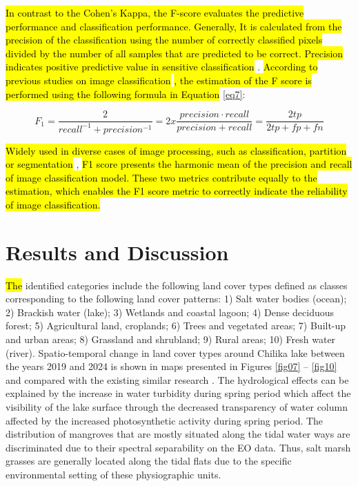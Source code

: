 \documentclass[jmse,article,submit,pdftex,moreauthors]{Definitions/mdpi}
\begin{document}
\hl{In contrast to the Cohen's Kappa, the F-score evaluates the predictive performance and classification performance. Generally, It is calculated from the precision of the classification using the number of correctly classified pixels divided by the number of all samples that are predicted to be correct. Precision indicates positive predictive value in sensitive classification} \cite{Hand,sitarz2022extending}. \hl{According to previous studies on image classification} \cite{Taha}\hl{, the estimation of the F score is performed using the following formula in Equation} \ref{eq7}:

\begin{equation}
F_1 = \frac{2}{recall^{-1} + precision^{-1}} = 2 x \frac{precision \cdot recall}{precision + recall} = \frac{2tp}{2tp + fp + fn}
\label{eq7}
\end{equation}

\hl{Widely used in diverse cases of image processing, such as classification, partition or segmentation} \cite{HUANG2018202,Song,Lietal2023}, \hl{F1 score presents the harmonic mean of the precision and recall of image classification model. These two metrics contribute equally to the estimation, which enables the F1 score metric to correctly indicate the reliability of image classification.}

\section{Results and Discussion}

\hl{The} identified categories include the following land cover types defined as classes corresponding to the following land cover patterns: 1) Salt water bodies (ocean); 2) Brackish water (lake);  3) Wetlands and coastal lagoon; 4) Dense deciduous forest; 5) Agricultural land, croplands; 6) Trees and vegetated areas; 7) Built-up and urban areas; 8) Grassland and shrubland; 9) Rural areas; 10) Fresh water (river). Spatio-temporal change in land cover types around Chilika lake between the years 2019 and 2024 is shown in maps presented in Figures \ref{fig07} -- \ref{fig10} and compared with the existing similar research \cite{Sinha2020,Mangla}. The hydrological effects can be explained by the increase in water turbidity during spring period which affect the visibility of the lake surface through the decreased transparency of water column affected by the increased photosynthetic activity during spring period. The distribution of mangroves that are mostly situated along the tidal water ways are discriminated due to their spectral separability on the EO data. Thus, salt marsh grasses are generally located along the tidal flats due to the specific environmental setting of these physiographic units. 
\end{document}

